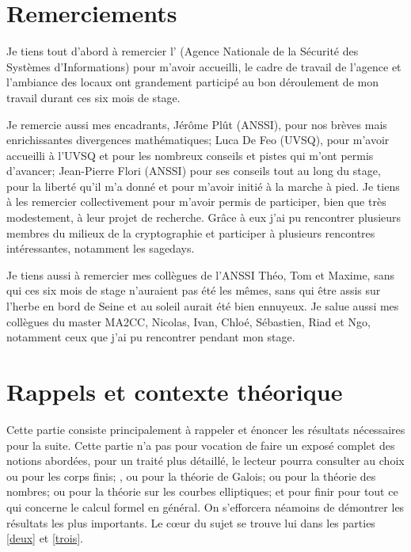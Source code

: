 \documentclass[a4paper]{article} %
\numberwithin{section}{part}
\numberwithin{equation}{section}
\begin{document}
\part*{Remerciements}
Je tiens tout d'abord à remercier l' (Agence Nationale de la Sécurité
des Systèmes d'Informations) pour m'avoir accueilli, le cadre de travail de 
l'agence et l'ambiance des locaux ont grandement participé au bon déroulement de
mon travail durant ces six mois de stage.\par
Je remercie aussi mes encadrants, Jérôme Plût (ANSSI), pour nos brèves mais
enrichissantes divergences mathématiques; Luca De Feo (UVSQ), pour m'avoir 
accueilli à l'UVSQ et pour les nombreux conseils et pistes qui m'ont permis
d'avancer; Jean-Pierre Flori (ANSSI) pour ses conseils tout au long du stage,
pour la liberté qu'il m'a donné et pour m'avoir initié à la marche à pied. 
Je tiens à les remercier collectivement pour m'avoir permis de participer, bien 
que très modestement, à leur projet de recherche. Grâce à eux j'ai pu rencontrer
plusieurs membres du milieux de la cryptographie et participer à plusieurs
rencontres intéressantes, notamment les sagedays.\par
Je tiens aussi à remercier mes collègues de l'ANSSI Théo, Tom et Maxime, sans qui
ces six mois de stage n'auraient pas été les mêmes, sans qui être assis sur 
l'herbe en bord de Seine et au soleil aurait été bien ennuyeux. Je salue 
aussi mes collègues du master MA2CC, Nicolas, Ivan, Chloé, Sébastien, Riad et 
Ngo, notamment ceux que j'ai pu rencontrer pendant mon stage.
\newpage

\tableofcontents
\listoffigures
\listofalgorithms
\listoftables
\newpage

\part{Rappels et contexte théorique}
\label{un}

Cette partie consiste principalement à rappeler et énoncer les résultats
nécessaires pour la suite. Cette partie n'a pas pour vocation de faire un exposé
complet des notions abordées, pour un traité plus 
détaillé, le lecteur pourra consulter au choix \cite{LiNi1} ou 
\cite[chap.~III]{Per} pour les corps finis; \cite[chap.~VI]{Sam}, \cite{Lan1} ou
\cite{Esc} pour la théorie de Galois; \cite{Sam} ou \cite{Lan2} pour la théorie 
des nombres; \cite{Sil} ou \cite{Was2} pour la théorie sur les courbes 
elliptiques; et pour finir \cite{GaGe} pour tout ce qui concerne le calcul 
formel en général. On s'efforcera néamoins de démontrer les résultats les plus 
importants. Le c\oe{}ur du sujet se trouve lui dans les parties \ref{deux} et 
\ref{trois}.
\end{document}

